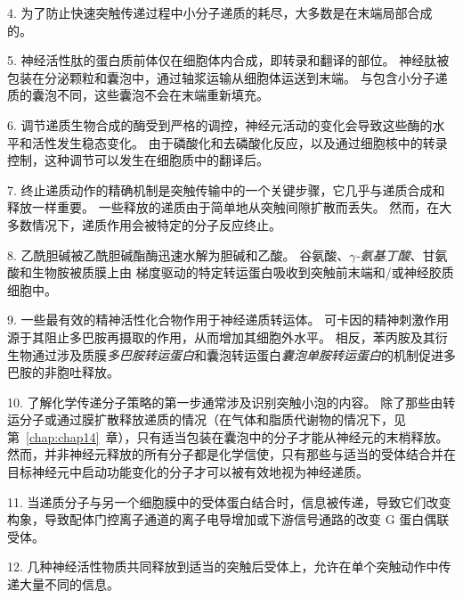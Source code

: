 4. 为了防止快速突触传递过程中小分子递质的耗尽，大多数是在末端局部合成的。


5. 神经活性肽的蛋白质前体仅在细胞体内合成，即转录和翻译的部位。
神经肽被包装在分泌颗粒和囊泡中，通过轴浆运输从细胞体运送到末端。
与包含小分子递质的囊泡不同，这些囊泡不会在末端重新填充。 


6. 调节递质生物合成的酶受到严格的调控，神经元活动的变化会导致这些酶的水平和活性发生稳态变化。
由于磷酸化和去磷酸化反应，以及通过细胞核中的转录控制，这种调节可以发生在细胞质中的翻译后。 


7. 终止递质动作的精确机制是突触传输中的一个关键步骤，它几乎与递质合成和释放一样重要。
一些释放的递质由于简单地从突触间隙扩散而丢失。
然而，在大多数情况下，递质作用会被特定的分子反应终止。 


8. 乙酰胆碱被乙酰胆碱酯酶迅速水解为胆碱和乙酸。
谷氨酸、\textit{$\gamma$-氨基丁酸}、甘氨酸和生物胺被质膜上由  梯度驱动的特定转运蛋白吸收到突触前末端和/或神经胶质细胞中。 


9. 一些最有效的精神活性化合物作用于神经递质转运体。
可卡因的精神刺激作用源于其阻止多巴胺再摄取的作用，从而增加其细胞外水平。
相反，苯丙胺及其衍生物通过涉及质膜\textit{多巴胺转运蛋白}和囊泡转运蛋白\textit{囊泡单胺转运蛋白}的机制促进多巴胺的非胞吐释放。 


10. 了解化学传递分子策略的第一步通常涉及识别突触小泡的内容。
除了那些由转运分子或通过膜扩散释放递质的情况（在气体和脂质代谢物的情况下，见第~\ref{chap:chap14}~章），只有适当包装在囊泡中的分子才能从神经元的末梢释放。
然而，并非神经元释放的所有分子都是化学信使，只有那些与适当的受体结合并在目标神经元中启动功能变化的分子才可以被有效地视为神经递质。 


11. 当递质分子与另一个细胞膜中的受体蛋白结合时，信息被传递，导致它们改变构象，导致配体门控离子通道的离子电导增加或下游信号通路的改变 G 蛋白偶联受体。 


12. 几种神经活性物质共同释放到适当的突触后受体上，允许在单个突触动作中传递大量不同的信息。


